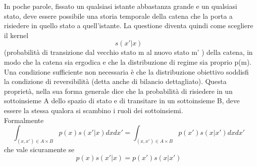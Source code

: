 In poche parole, fissato un qualsiasi istante abbastanza grande e un qualsiasi stato,
deve essere possibile una storia temporale della catena che la porta a risiedere in
quello stato a quell’istante. La questione diventa quindi come scegliere il kernel
\begin{equation*}
s(x' |x) 
\end{equation*}
(probabilità   di transizione dal vecchio stato m al nuovo stato m' ) della catena,
in modo che la catena sia ergodica e che la distribuzione di regime sia proprio p(m).
Una condizione sufficiente non necessaria è   che la distribuzione obiettivo soddisfi la
condizione di reversibilità (detta anche di bilancio dettagliato).
Questa proprietà, nella sua forma generale dice che la probabilità di risiedere in un sottoinsieme A dello spazio di stato e di transitare in un sottoinsieme B, deve essere la stessa qualora si scambino i ruoli dei sottoinsiemi.\\
Formalmente 
\begin{equation}
\int_{(x,x')\in A\times B}p(x)s(x' |x) dx dx'= \int_{(x,x')\in A\times B}p(x')s(x|x' )dx dx'
\end{equation}
che vale sicuramente se
\begin{equation}
p(x)s(x' |x) = p(x')s(x|x' )
\end{equation}

